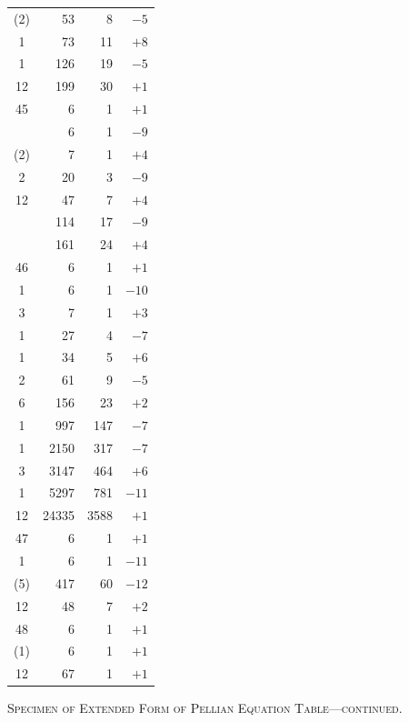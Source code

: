 \documentclass[11pt]{article}
\begin{document}
\begin{center}
\begin{tabular}{|c|r|r|r|}
(2) & 53 & 8 & $-5$ \\
1 & 73 & 11 & $+8$ \\
1 & 126 & 19 & $-5$ \\
12 & 199 & 30 & $+1$ \\
\hline
45 & 6 & 1 & $+1$ \\
 & 6 & 1 & $-9$ \\
(2) & 7 & 1 & $+4$ \\
2 & 20 & 3 & $-9$ \\
12 & 47 & 7 & $+4$ \\
 & 114 & 17 & $-9$ \\
 & 161 & 24 & $+4$ \\
\hline
46 & 6 & 1 & $+1$ \\
1 & 6 & 1 & $-10$ \\
3 & 7 & 1 & $+3$ \\
1 & 27 & 4 & $-7$ \\
1 & 34 & 5 & $+6$ \\
2 & 61 & 9 & $-5$ \\
6 & 156 & 23 & $+2$ \\
1 & 997 & 147 & $-7$ \\
1 & 2150 & 317 & $-7$ \\
3 & 3147 & 464 & $+6$ \\
1 & 5297 & 781 & $-11$ \\
12 & 24335 & 3588 & $+1$ \\
\hline
47 & 6 & 1 & $+1$ \\
1 & 6 & 1 & $-11$ \\
(5) & 417 & 60 & $-12$ \\
12 & 48 & 7 & $+2$ \\
\hline
48 & 6 & 1 & $+1$ \\
(1) & 6 & 1 & $+1$ \\
12 & 67 & 1 & $+1$ \\
\hline
\end{tabular}
\end{center}

\begin{center}
\small\textsc{Specimen of Extended Form of Pellian Equation Table---continued.}
\end{center}
\end{document}
